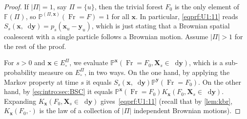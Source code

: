 \documentclass[reqno,draft]{amsart}
\numberwithin{equation}{section}
\theoremstyle{plain}
\theoremstyle{remark}
\renewcommand{\P}{\mathbb{P}} %
\newcommand*\diff{\mathop{}\!\mathrm{d}}
\newcommand{\fpart}{\Pi} %
\newcommand{\semi}{S}
\DeclareMathOperator{\fr}{Fr}
\newcommand{\nn}{\widetilde{N}} %
\begin{document}
\begin{proof}
    If $|\fpart| =1$, say $\fpart = \{u\}$, then the trivial forest $F_0$ is the only element of $\mathbb{F}(\fpart)$, so $\P^{(\fpart,\boldsymbol x)}(\fr = F) = 1$ for all $\boldsymbol x$. In particular, \eqref{eqprf:U1:11} reads $\semi_s(\boldsymbol x, \diff \boldsymbol y) = p_s(\boldsymbol x_u - \boldsymbol y_u)$, which is just stating that a Brownian spatial coalescent with a single particle follows a Brownian motion. Assume $|\fpart| > 1$ for the rest of the proof.

    For $s > 0$ and $\boldsymbol x\in E^\fpart_\circ $, we evaluate $\P^{\boldsymbol x}(\fr = F_0, \boldsymbol X_s \in \diff \boldsymbol y)$, which is a sub-probability measure on $E^\fpart_\circ $, in two ways. On the one hand, by applying the Markov property at time $s$ it equals $\semi_s(\boldsymbol x,\diff \boldsymbol y) \P^{\boldsymbol y}(\fr = F_0)$. On the other hand, by \cref{eq:intro:sec:BSC} it equals $\P^{\boldsymbol x}(\fr = F_0) K_{\boldsymbol x}(F_0,\boldsymbol X_s\in \diff \boldsymbol y)$. Expanding $K_{\boldsymbol x}(F_0,\boldsymbol X_s\in \diff \boldsymbol y)$ gives~\eqref{eqprf:U1:11} (recall that by \cref{lem:kbr}, $K_{\boldsymbol x}(F_0,\cdot )$ is the law of a collection of $|\fpart|$ independent Brownian motions).



\end{proof}
\end{document}
